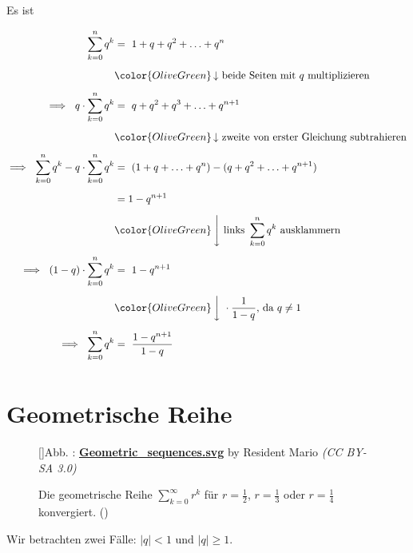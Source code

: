 \documentclass[fontsize=9pt,
               parskip=half-,
               DIV=14,
               listof=chapterentry,
               tocflat]{scrbook}
\newcounter{imagelabel}
\begin{document}
\begin{proof*}
Es ist

\begin{align*}
\sum _{k=0}^{n}q^{k}&=\ 1+q+q^{2}+\ldots +q^{n}\\[0.5em]&{\color {OliveGreen}\left\downarrow \ {\text{beide Seiten mit }}q{\text{ multiplizieren}}\right.}\\[0.5em]\implies \ q\cdot \sum _{k=0}^{n}q^{k}&=\ q+q^{2}+q^{3}+\ldots +q^{n+1}\\[0.5em]&{\color {OliveGreen}\left\downarrow \ {\text{zweite von erster Gleichung subtrahieren}}\right.}\\[0.5em]\implies \ \sum _{k=0}^{n}q^{k}-q\cdot \sum _{k=0}^{n}q^{k}&=\ (1+q+\ldots +q^{n})-(q+q^{2}+\ldots +q^{n+1})\\[0.5em]&=1-q^{n+1}\\[0.5em]&{\color {OliveGreen}\left\downarrow \ {\text{links }}\sum _{k=0}^{n}q^{k}{\text{ ausklammern}}\right.}\\[0.5em]\implies \ (1-q)\cdot \sum _{k=0}^{n}q^{k}&=\ 1-q^{n+1}\\[0.5em]&{\color {OliveGreen}\left\downarrow \ {}\cdot {\frac {1}{1-q}}{\text{, da }}q\neq 1\right.}\\[0.5em]\implies \ \sum _{k=0}^{n}q^{k}&=\ {\frac {1-q^{n+1}}{1-q}}\\[0.5em]
\end{align*}

\end{proof*}

\section{Geometrische Reihe}

\begin{figure}[h]
\vspace{\baselineskip}
[]{Abb. : \protect\href{https://commons.wikimedia.org/wiki/File:Geometric_sequences.svg}{\textbf{Geometric\allowbreak\_sequences.svg}} by Resident Mario \textit{(CC BY-SA 3.0)}}\centering
{}
\caption*{Die geometrische Reihe $\sum _{k=0}^{\infty }r^{k}$ für $r={\tfrac {1}{2}}$, $r={\tfrac {1}{3}}$ oder $r={\tfrac {1}{4}}$ konvergiert. ()}
\end{figure}
Wir betrachten zwei Fälle: $|q|<1{\text{ und }}|q|\geq 1$.
\end{document}
